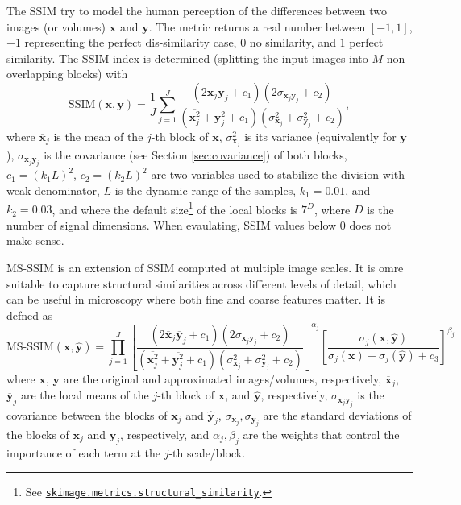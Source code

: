 \documentclass{article}
\begin{document}
The SSIM \cite{wang2004image} try to model the human perception of the
differences between two images (or volumes) $\mathbf{x}$ and
$\mathbf{y}$. The metric returns a real number between $[-1, 1]$, $-1$
representing the perfect dis-similarity case, $0$ no similarity, and
$1$ perfect similarity. The SSIM index is determined (splitting the
input images into $M$ non-overlapping blocks) with
\begin{equation}
  \text{SSIM}(\mathbf{x}, \mathbf{y}) = \frac{1}{J} \sum_{j=1}^J \frac{(2\overline{\mathbf{x}}_j \overline{\mathbf{y}}_j + c_1)(2\sigma_{\mathbf{x}_j \mathbf{y}_j} + c_2)}{(\overline{\mathbf{x}_j^2} + \overline{\mathbf{y}_j^2} + c_1)(\sigma^2_{\mathbf{x}_j} + \sigma^2_{\mathbf{y}_j} + c_2)},
\end{equation}
where $\overline{\mathbf x}_j$ is the mean of the $j$-th block of
$\mathbf{x}$, $\sigma^2_{\mathbf{x}_j}$ is its variance (equivalently
for $\mathbf{y}$), $\sigma_{\mathbf{x}_j\mathbf{y}_j}$ is the
covariance (see Section \ref{sec:covariance}) of both blocks,
$c_1=(k_1L)^2$, $c_2=(k_2L)^2$ are two variables used to stabilize the
division with weak denominator, $L$ is the dynamic range of the
samples, $k_1=0.01$, and $k_2=0.03$, and where the default
size\footnote{See
  \href{https://scikit-image.org/docs/stable/api/skimage.metrics.html\#skimage.metrics.structural_similarity}{\texttt{skimage.metrics.structural\_similarity}}.}
of the local blocks is $7^D$, where $D$ is the number of signal
dimensions. When evaulating, SSIM values below $0$ does not make
sense.

MS-SSIM \cite{wang2003multiscale} is an extension of SSIM computed at
multiple image scales. It is omre suitable to capture structural
similarities across different levels of detail, which can be useful in
microscopy where both fine and coarse features matter. It is defned as
\begin{equation}
  \text{MS-SSIM}(\mathbf{x}, \hat{\mathbf{y}}) = \prod_{j=1}^{J} \left[ \frac{(2 \overline{\mathbf{x}}_j \overline{\mathbf{y}}_j + c_1)(2\sigma_{\mathbf{x}_j \mathbf{y}_j} + c_2)}{(\overline{\mathbf{x}_j^2} + \overline{\mathbf{y}_j^2} + c_1)(\sigma^2_{\mathbf{x}_j} + \sigma^2_{\mathbf{y}_j} + c_2)} \right]^{\alpha_j} \left[ \frac{\sigma_j(\mathbf{x}, \hat{\mathbf{y}})}{\sigma_j(\mathbf{x}) + \sigma_j(\hat{\mathbf{y}}) + c_3} \right]^{\beta_j}
\end{equation}
where $\mathbf{x}$, $\mathbf{y}$ are the original and approximated
images/volumes, respectively, $\overline{\mathbf{x}}_j$,
$\overline{\mathbf{y}}_j$ are the local means of the $j\text{-th}$
block of $\mathbf{x}$, and $\hat{\mathbf{y}}$, respectively,
$\sigma_{\mathbf{x}_j \mathbf{y}_j}$ is the covariance between the
blocks of $\mathbf{x}_j$ and $\hat{\mathbf{y}}_j$,
$\sigma_{\mathbf{x}_j}, \sigma_{\mathbf{y}_j}$ are the standard
deviations of the blocks of $\mathbf{x}_j$ and $\mathbf{y}_j$,
respectively, and $\alpha_j, \beta_j$ are the weights that control the
importance of each term at the $j\text{-th}$ scale/block.
\end{document}
